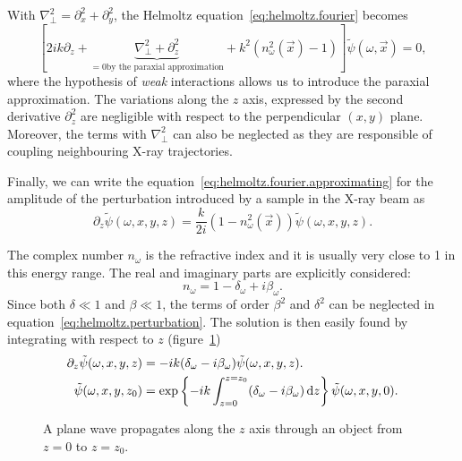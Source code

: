 With  $\nabla_\perp^2 = \partial_x^2 + \partial_y^2$, the Helmoltz
equation~\eqref{eq:helmoltz.fourier} becomes
\begin{equation}
    \left[ 2ik \partial_z + \underbrace{\nabla_\perp^2 +
    \partial^2_z}_{=0 \text{by the paraxial approximation}} + k^2 (n^2_\omega(\vec{x}) - 1)
\right]\tilde{\psi}(\omega, \vec{x}) = 0,
\label{eq:helmoltz.fourier.approximating}
\end{equation}
where the hypothesis of \emph{weak} interactions allows us to introduce the paraxial
approximation. The variations along the $z$ axis, expressed by the
second derivative $\partial_z^2$ are negligible with
respect to the perpendicular $(x,y)$ plane. Moreover, the terms with
$\nabla_\perp^2$ can also be neglected as they are responsible of coupling
neighbouring X-ray trajectories.

Finally, we can write the equation~\eqref{eq:helmoltz.fourier.approximating}
for the amplitude of the perturbation introduced by a sample in the X-ray
beam as
\begin{equation}
    \partial_z \tilde{\psi}(\omega, x, y, z) =
    \frac{k}{2i}(1 - n^2_\omega(\vec{x}))\tilde{\psi}(\omega, x, y, z).
    \label{eq:helmoltz.perturbation}
\end{equation}

The complex number $n_\omega$ is the refractive index and it is usually
very close to 1 in this energy range. The real and imaginary parts are
explicitly considered:
\begin{equation}
    n_\omega = 1 - \delta_\omega + i\beta_\omega.
\end{equation}
Since both $\delta \ll 1$ and $\beta \ll 1$, the terms of order $\beta^2$ and
$\delta^2$ can be neglected in equation~\eqref{eq:helmoltz.perturbation}.
The solution is then easily found by integrating with respect to $z$
(figure~\ref{fig:propagation})
\begin{align}
    \partial_z \tilde{\psi}(\omega, x, y, z) &=
    -ik(\delta_\omega -i\beta_\omega)\tilde{\psi}(\omega, x, y, z).\\
    \tilde{\psi}(\omega, x, y, z_0) &= \exp\left\{-ik\int_{z=0}^{z=z_0}(\delta_\omega - i
\beta_\omega) \operatorname{d}\!{z} \right\} \tilde{\psi}(\omega, x, y, 0).
\label{eq:helmoltz.solution}
\end{align}

\begin{figure}[htb]
    \centering
    
    \caption[Plane wave propagation.]{A plane wave propagates along the $z$
        axis through an object from $z = 0$ to $z = z_0$.}
    \label{fig:propagation}
\end{figure}

